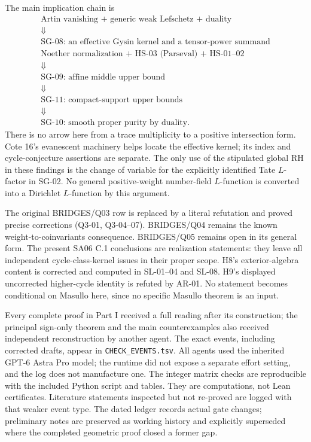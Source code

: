 \documentclass[11pt,a4paper]{article}
\theoremstyle{remark}
\begin{document}
The main implication chain is
\[
 \begin{gathered}
 \text{Artin vanishing + generic weak Lefschetz + duality}\\
 \Downarrow\\
 \text{SG-08: an effective Gysin kernel and a tensor-power summand}\\
 \text{Noether normalization + HS-03 (Parseval) + HS-01--02}\\
 \Downarrow\\
 \text{SG-09: affine middle upper bound}\\
 \Downarrow\\
 \text{SG-11: compact-support upper bounds}\\
 \Downarrow\\
 \text{SG-10: smooth proper purity by duality.}
 \end{gathered}
\]
There is no arrow here from a trace multiplicity to a positive
intersection form.  Cote 16's evanescent machinery helps locate the
effective kernel; its index and cycle-conjecture assertions are separate.
The only use of the stipulated global RH in these findings is the
change of variable for the explicitly identified Tate $L$-factor in
SG-02.  No general positive-weight number-field $L$-function is converted
into a Dirichlet $L$-function by this argument.

The original BRIDGES/Q03 row is replaced by a literal refutation and
proved precise corrections (Q3-01, Q3-04--07).  BRIDGES/Q04 remains the
known weight-to-coinvariants consequence.  BRIDGES/Q05 remains open in
its general form.  The present SA06 C.1 conclusions are realization
statements: they leave all independent cycle-class-kernel issues in
their proper scope.  H8's exterior-algebra content is corrected and
computed in SL-01--04 and SL-08.  H9's displayed uncorrected higher-cycle
identity is refuted by AR-01.  No statement becomes conditional on
Masullo here, since no specific Masullo theorem is an input.

Every complete proof in Part I received a full reading after its
construction; the principal sign-only theorem and the main counterexamples
also received independent reconstruction by another agent.  The exact
events, including corrected drafts, appear in \texttt{CHECK\_EVENTS.tsv}.
All agents used the inherited GPT-6 Astra Pro model; the runtime did not
expose a separate effort setting, and the log does not manufacture one.
The integer matrix checks are reproducible with the included Python
script and tables.  They are computations, not Lean certificates.
Literature statements inspected but not re-proved are logged with that
weaker event type.  The dated ledger records actual gate changes;
preliminary notes are preserved as working history and explicitly
superseded where the completed geometric proof closed a former gap.
\end{document}
